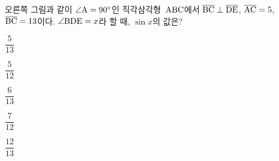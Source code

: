 \noindent\begin{minipage}[t]{0.58\linewidth}\vspace{0pt}\raggedright 오른쪽 그림과 같이 $\angle\mathrm{A}=90^\circ$인 직각삼각형~$\mathrm{ABC}$에서 $\overline{\mathrm{BC}}\perp\overline{\mathrm{DE}}$, $\overline{\mathrm{AC}}=5$, $\overline{\mathrm{BC}}=13$이다. $\angle\mathrm{BDE}=x$라 할 때, $\sin x$의 값은?\end{minipage}\hfill\begin{minipage}[t]{0.4\linewidth}\vspace{0pt}\centering \resizebox{\ifdim\width>\linewidth\linewidth\else\width\fi}{!}{}\end{minipage}\par
\begin{choices32}{\rule[-3ex]{0pt}{8ex}$\dfrac{5}{13}$}{\rule[-3ex]{0pt}{8ex}$\dfrac{5}{12}$}{\rule[-3ex]{0pt}{8ex}$\dfrac{6}{13}$}{\rule[-3ex]{0pt}{8ex}$\dfrac{7}{12}$}{\rule[-3ex]{0pt}{8ex}$\dfrac{12}{13}$}\end{choices32}
